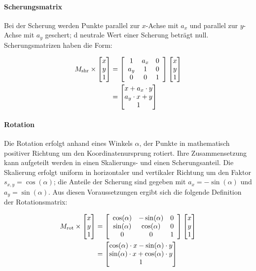 \paragraph{Scherungsmatrix}
\label{par:scherung}

Bei der Scherung werden Punkte parallel zur $x$-Achse mit $a_x$ und parallel zur $y$-Achse mit $a_y$ geschert; d neutrale Wert einer Scherung beträgt null. Scherungsmatrizen haben die Form:

{\setlength{\belowdisplayskip}{0.5ex}
\begin{align*}
    M_\text{shr} \times \begin{bmatrix} x \\ y \\ 1 \end{bmatrix}
     & =
    \left[
        \begin{array}{ccc}
            1   & a_x & 0 \\
            a_y & 1   & 0 \\
            0   & 0   & 1 \\
        \end{array}
        \right]
    \begin{bmatrix} x \\ y \\ 1 \end{bmatrix} \\
     & =
    \begin{bmatrix} x + a_x \cdot y \\ a_y \cdot x + y \\ 1 \end{bmatrix}
\end{align*}}

\paragraph{Rotation}
\label{par:rotation}

Die Rotation erfolgt anhand eines Winkels $\alpha$, der Punkte in mathematisch positiver Richtung um den Koordinatenursprung rotiert. Ihre Zusammensetzung kann aufgeteilt werden in einen Skalierungs- und einen Scherungsanteil. Die Skalierung erfolgt uniform in horizontaler und vertikaler Richtung um den Faktor $s_{x, y} = \cos(\alpha)$; die Anteile der Scherung sind gegeben mit $a_x = -\sin(\alpha)$ und $a_y = \sin(\alpha)$. Aus diesen Voraussetzungen ergibt sich die folgende Definition der Rotationsmatrix:

{\setlength{\belowdisplayskip}{0.5ex}
\begin{align*}
    M_\text{rot} \times \begin{bmatrix} x \\ y \\ 1 \end{bmatrix}
     & =
    \left[
        \begin{array}{ccc}
            \cos(\alpha) & -\sin(\alpha) & 0 \\
            \sin(\alpha) & \cos(\alpha)  & 0 \\
            0            & 0             & 1 \\
        \end{array}
        \right]
    \begin{bmatrix} x \\ y \\ 1 \end{bmatrix} \\
     & =
    \begin{bmatrix} \cos(\alpha) \cdot x - \sin(\alpha) \cdot y \\ \sin(\alpha) \cdot x + \cos(\alpha) \cdot y \\ 1 \end{bmatrix}
\end{align*}}

